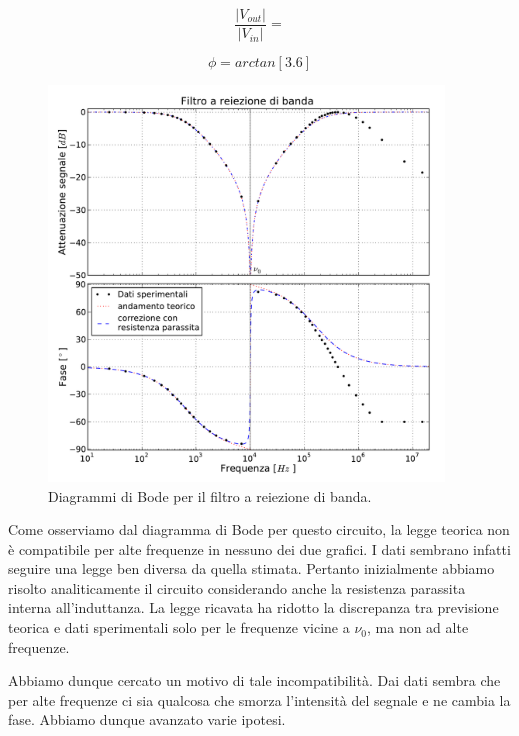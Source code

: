 \noindent
\begin{minipage}{.5\linewidth}
\begin{equation}
\frac{|V_{out}|}{|V_{in}|}=
\end{equation}
\end{minipage}%
\begin{minipage}{.5\linewidth}
\begin{equation}
\phi=arctan[3.6]
\end{equation}
\end{minipage}
\break
\begin{figure}
    \includegraphics[width=105mm]{notch.pdf}
    \caption{Diagrammi di Bode per il filtro a reiezione di banda.}
    \label{fig:notch}
\end{figure}

Come osserviamo dal diagramma di Bode per questo circuito, la legge teorica non è compatibile per alte frequenze in nessuno dei due grafici. I dati sembrano infatti seguire una legge ben diversa da quella stimata. Pertanto inizialmente abbiamo risolto analiticamente il circuito considerando anche la resistenza parassita interna all'induttanza. La legge ricavata ha ridotto la discrepanza tra previsione teorica e dati sperimentali solo per le frequenze vicine a $\nu_0$, ma non ad alte frequenze.

Abbiamo dunque cercato un motivo di tale incompatibilità. Dai dati sembra che per alte frequenze ci sia qualcosa che smorza l'intensità del segnale e ne cambia la fase. Abbiamo dunque avanzato varie ipotesi.

